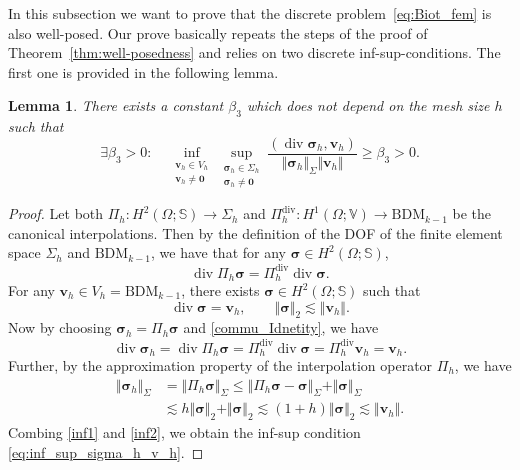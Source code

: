 \documentclass[11pt]{amsart}
\newtheorem{lemma}[theorem]{Lemma}
\theoremstyle{remark}
\theoremstyle{definition}
\def\sig{{\bm \sigma}}
\def\bv{{\boldsymbol v}}
\renewcommand{\div}{\operatorname{div}}
\renewcommand{\div}{\operatorname{div}}
\def\sig{\boldsymbol \sigma}
\def\bv{\boldsymbol v}
\begin{document}
In this subsection we want to prove that the discrete problem~\eqref{eq:Biot_fem} is also well-posed.
Our prove basically repeats the steps of the proof of Theorem~\ref{thm:well-posedness} and relies on
{ two discrete inf-sup-conditions. The first one is provided in the following lemma.}
%
\begin{lemma}\label{lem:inf_sup}
There exists a constant $\beta_3$ which does not depend on the mesh size $h$ such that
\begin{equation}\label{eq:inf_sup_sigma_h_v_h}
\exists \beta_{3} > 0: \quad \inf_{\substack{\bv_h \in V_h \\ \bv_h \neq \bm 0}} \sup_{\substack{\sig_h \in \Sigma_h \\ \sig_h \neq \bm 0}}
\frac{(\div \sig_h,\bv_h)}{\Vert \sig_h \Vert_\Sigma \Vert \bv_h \Vert} \ge \beta_{3} > 0. 
\end{equation} 
\end{lemma}
\begin{proof}
Let both
$\Pi_h: H^2(\Omega;\mathbb{S})\rightarrow \Sigma_h$
and $\Pi_h^{\div}: H^1(\Omega;\mathbb{V})\rightarrow \text{BDM}_{k-1}$
be the canonical interpolations. Then by the definition of the DOF of the finite element space $\Sigma_h$ and $\text{BDM}_{k-1}$, we have that for any
$\sig\in H^2(\Omega; \mathbb{S})$, 
\begin{equation}\label{commu_Idnetity}
\div \Pi_h \sig=\Pi_h^{\div}\div \sig. 
\end{equation}
For any $\bv_h \in V_h =\text{BDM}_{k-1}$, there exists
$\sig \in H^2(\Omega;\mathbb{S})$
such that \cite{costabel2010bogovskiui}
$$
\div{\sig}=\bv_h, \qquad\Vert \sig \Vert_2\lesssim \Vert \bv_h\Vert. 
$$
Now by choosing $\sig_h=\Pi_h\sig$ and \eqref{commu_Idnetity}, we have 
\begin{equation}\label{inf1}
\div\sig_h=\div\Pi_h\sig=\Pi_h^{\div}\div \sig=\Pi_h^{\div} \bv_h=\bv_h. 
\end{equation}
Further, by the approximation property of the interpolation operator $\Pi_h$, we have 
\begin{subequations}\label{inf2}
\begin{align}
\Vert \sig_h\Vert_\Sigma&=\Vert \Pi_h\sig\Vert_\Sigma \le \Vert \Pi_h\sig-\sig\Vert_\Sigma+\Vert \sig\Vert_\Sigma\\
&\lesssim h \Vert \sig\Vert_2+\Vert \sig\Vert_2\lesssim  (1+h) \Vert \sig\Vert_2 \lesssim \Vert\bv_h\Vert.
\end{align}
\end{subequations}
Combing \eqref{inf1} and \eqref{inf2}, we obtain the inf-sup condition \eqref{eq:inf_sup_sigma_h_v_h}. 
\end{proof}
\end{document}
